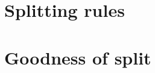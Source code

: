 \section{Splitting rules}
\label{sec:3:splitting-rules}


\section{Goodness of split}
\label{sec:3:criteria}


